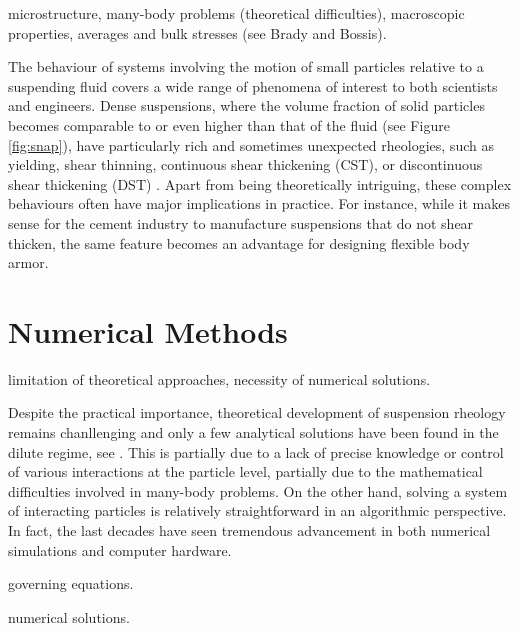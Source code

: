 microstructure,
many-body problems (theoretical difficulties),
macroscopic properties, averages and bulk stresses (see Brady and Bossis).

The behaviour of systems involving the motion of small particles relative to a suspending fluid covers a wide range of phenomena of interest to both scientists and engineers. Dense suspensions, where the volume fraction of solid particles becomes comparable to or even higher than that of the fluid (see Figure \ref{fig:snap}), have particularly rich and sometimes unexpected rheologies, such as yielding, shear thinning, continuous shear thickening (CST), or discontinuous shear thickening (DST) \citep{mewis_wagner_book, Morton_Morris_2014, guazzelli_pouliquen_2018, Morris_annurev2020}. Apart from being theoretically intriguing, these complex behaviours often have major implications in practice. For instance, while it makes sense for the cement industry to manufacture suspensions that do not shear thicken, the same feature becomes an advantage for designing flexible body armor.



\chapter{Numerical Methods}



limitation of theoretical approaches,
necessity of numerical solutions.

Despite the practical importance, theoretical development of suspension rheology remains chanllenging and only a few analytical solutions have been found in the dilute regime, see \eg \cite{Einstein_1906, batchelor_green_1972b}. This is partially due to a lack of precise knowledge or control of various interactions at the particle level, partially due to the mathematical difficulties involved in many-body problems. On the other hand, solving a system of interacting particles is relatively straightforward in an algorithmic perspective. In fact, the last decades have seen tremendous advancement in both numerical simulations and computer hardware.

governing equations.

numerical solutions.



